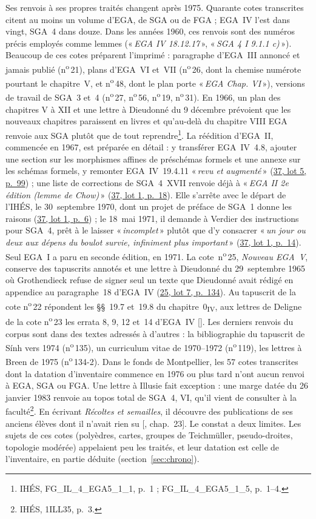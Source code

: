 \documentclass[11pt]{amsart}
\makeatletter
\newcommand{\q}[1]{«\,\textit{#1}\,»}
\newcommand{\cote}[1]{\mbox{n\textsuperscript{o}\,#1}}
\def\RHM@first#1--#2\@nil{#1}
\DeclareRobustCommand{\lot}[3]{\begingroup\edef\RHM@pdfpage{\the\numexpr\RHM@first#3--\@nil+1\relax}\href{https://grothendieck.umontpellier.fr/#1.pdf\#page=\RHM@pdfpage}{#1, lot #2, p.~#3}\endgroup}
\newcommand{\lot}[3]{\href{https://grothendieck.commutator.io/\##1/#2/p#3}{#1, lot #2, p.~#3}}
\makeatother
\begin{document}
Ses renvois à ses propres traités changent après 1975. Quarante cotes transcrites citent au moins un volume d'EGA, de SGA ou de FGA ; EGA~IV l'est dans vingt, SGA~4 dans douze. Dans les années 1960, ces renvois sont des numéros précis employés comme lemmes (\q{EGA IV 18.12.17}, \q{SGA 4 I 9.1.1 c)}). Beaucoup de ces cotes préparent l'imprimé : paragraphe d'EGA~III annoncé et jamais publié (\cote{21}), plans d'EGA~VI et~VII (\cote{26}, dont la chemise numérote pourtant le chapitre~V, et \cote{48}, dont le plan porte \q{EGA Chap. VI}), versions de travail de SGA~3 et~4 (\cote{27}, \cote{56}, \cote{19}, \cote{31}). En 1966, un plan des chapitres V à XII et une lettre à Dieudonné du 9 décembre prévoient que les nouveaux chapitres paraissent en livres et qu'au-delà du chapitre VIII EGA renvoie aux SGA plutôt que de tout reprendre\footnote{IHÉS, FG\_IL\_4\_EGA5\_1\_1, p.~1 ; FG\_IL\_4\_EGA5\_1\_5, p.~1--4.}. La réédition d'EGA~II, commencée en 1967, est préparée en détail : y transférer EGA~IV~4.8, ajouter une section sur les morphismes affines de préschémas formels et une annexe sur les schémas formels, y remonter EGA~IV~19.4.11 \q{revu et augmenté} (\lot{37}{5}{99}) ; une liste de corrections de SGA~4~XVII renvoie déjà à \q{EGA II 2e édition (lemme de Chow)} (\lot{37}{1}{18}). Elle s'arrête avec le départ de l'IHÉS, le 30~septembre 1970, dont un projet de préface de SGA~1 donne les raisons (\lot{37}{1}{6}) ; le 18~mai 1971, il demande à Verdier des instructions pour SGA~4, prêt à le laisser \q{incomplet} plutôt que d'y consacrer \q{un jour ou deux aux dépens du boulot survie, infiniment plus important} (\lot{37}{1}{14}). Seul EGA~I a paru en seconde édition, en 1971. La cote~\cote{25}, \emph{Nouveau EGA~V}, conserve des tapuscrits annotés et une lettre à Dieudonné du 29~septembre 1965 où Grothendieck refuse de signer seul un texte que Dieudonné avait rédigé en appendice au paragraphe~18 d'EGA~IV (\lot{25}{7}{134}). Au tapuscrit de la cote \cote{22} répondent les §§~19.7 et~19.8 du chapitre~0\textsubscript{IV}, aux lettres de Deligne de la cote \cote{23} les errata 8, 9, 12 et~14 d'EGA~IV [\citealp{ega}]. Les derniers renvois du corpus sont dans des textes adressés à d'autres : la bibliographie du tapuscrit de Sính vers 1974 (\cote{135}), un curriculum vitae de 1970--1972 (\cote{119}), les lettres à Breen de 1975 (\cote{134-2}). Dans le fonds de Montpellier, les 57 cotes transcrites dont la datation d'inventaire commence en 1976 ou plus tard n'ont aucun renvoi à EGA, SGA ou FGA. Une lettre à Illusie fait exception : une marge datée du 26 janvier 1983 renvoie au topos total de SGA~4, VI, qu'il vient de consulter à la faculté\footnote{IHÉS, 1ILL35, p.~3.}. En écrivant \emph{Récoltes et semailles}, il découvre des publications de ses anciens élèves dont il n'avait rien su [\citealp{circle-spirit}, chap.~23]. Le constat a deux limites. Les sujets de ces cotes (polyèdres, cartes, groupes de Teichmüller, pseudo-droites, topologie modérée) appelaient peu les traités, et leur datation est celle de l'inventaire, en partie déduite (section~\ref{sec:chrono}).
\end{document}
